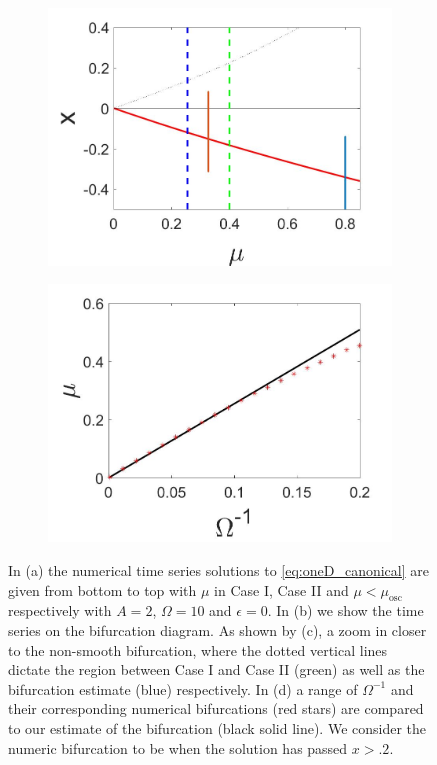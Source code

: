 \begin{figure}[H]
\begin{subfigure}{.5\textwidth}
  \includegraphics[width=\linewidth]{oneD/osc_bif_diagram_zoom.jpg}
  \caption{}
\end{subfigure}%
\begin{subfigure}{.5\textwidth}
\centering
\includegraphics[width=\linewidth]{oneD/osc_Omegacomp.jpg}
\caption{}
\label{fig:oneD_osc_comp}
\end{subfigure}
\caption{In (a) the numerical time series solutions to \eqref{eq:oneD_canonical} are given from bottom to top with $\mu$ in Case I, Case II and $\mu<\mu_{\text{osc}}$ respectively with $A=2$, $\Omega=10$ and $\epsilon=0$. In (b) we show the time series on the bifurcation diagram. As shown by (c), a zoom in closer to the non-smooth bifurcation, where the dotted vertical lines dictate the region between Case I and Case II (green) as well as the bifurcation estimate (blue) respectively. In (d) a range of $\Omega^{-1}$ and their corresponding numerical bifurcations (red stars) are compared to our estimate of the bifurcation (black solid line). We consider the numeric bifurcation to be when the solution has passed $x>.2$.}
\label{fig:oneD_osc_numerics}
\end{figure}

